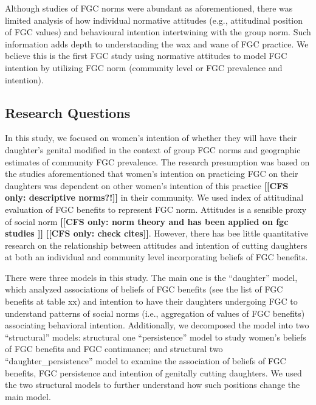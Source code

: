 \documentclass[12pt,]{article}
\newcommand{\comment}[1]{\textbf{[[#1]]}}
\newcommand{\cfonly}[1]{\comment{CFS only: #1}}
\begin{document}
Although studies of FGC norms were abundant  as aforementioned, there was limited analysis of how individual normative attitudes (e.g., attitudinal position of FGC values) and behavioural intention intertwining with the group norm.  Such information adds depth to understanding the wax and wane of FGC practice.  We believe this is the first FGC study using normative attitudes to model FGC intention by utilizing FGC norm (community level or FGC prevalence and intention).

\subsection{Research Questions}\label{research-questions}

In this study, we focused on women’s intention of whether they will have their daughter’s genital modified in the context of group FGC norms and geographic estimates of community FGC prevalence.  The research presumption was based on the studies aforementioned that women’s intention on practicing FGC on their daughters was dependent on other women’s intention of this practice \cfonly{descriptive norms?!} in their community. We used index of attitudinal evaluation of FGC benefits to represent FGC norm.  Attitudes is a sensible proxy of social norm \cfonly {norm theory \cite{Ajze91, Ajze02, Bicc10, BiccMari15, Mack96, Mack00, MackLeJe08, RimaLapi15, Youn11} and has been applied on fgc studies \cite{CislHeis18, EffeVogt15, Harf06, ModrLiu13 , PashPonn16, ShelHern06,}} \cfonly{check cites}.  However, there has bee little quantitative research on the relationship between attitudes and intention of cutting daughters at both an individual and community level incorporating beliefs of FGC benefits.

There were three models in this study.  The main one is the “daughter” model, which analyzed associations of beliefs of FGC benefits (see the list of FGC benefits at table xx) and intention to have their daughters undergoing FGC to understand patterns of social norms (i.e., aggregation of values of FGC benefits) associating behavioral intention.  Additionally, we decomposed the model into two “structural” models:  structural one “persistence” model to study women’s beliefs of FGC benefits and FGC continuance; and structural two “daughter_persistence”   model to examine the association of beliefs of FGC benefits, FGC persistence and intention of genitally cutting daughters.  We used the two structural models to further understand how such positions change the main model.
\end{document}
